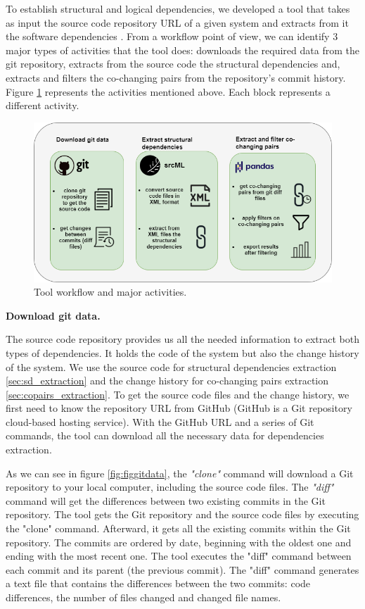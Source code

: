 \documentclass[12pt]{mitthesis}
\begin{document}
To establish structural and logical dependencies, we developed a tool that takes as input the source code repository URL of a given system and extracts from it the software dependencies \cite{DepSACI}. 
From a workflow point of view, we can identify 3 major types of activities that the tool does: downloads the required data from the git repository, extracts from the source code the structural dependencies and, extracts and filters the co-changing pairs from the repository's commit history. Figure \ref{fig:figworkflow} represents the activities mentioned above. Each block represents a different activity. 

\begin{figure}[H]
\centering
\includegraphics[width=\textwidth]{tool_workflow.png}
\caption{Tool workflow and major activities.}
\label{fig:figworkflow}
\end{figure}


\textbf{Download git data.}

The source code repository provides us all the needed information to extract both types of dependencies. It holds the code of the system but also the change history of the system. We use the source code for structural dependencies extraction \ref{sec:sd_extraction} and the change history for co-changing pairs extraction \ref{sec:copairs_extraction}.
To get the source code files and the change history, we first need to know the repository URL from GitHub (GitHub is a Git repository cloud-based hosting service). With the GitHub URL and a series of Git commands, the tool can download all the necessary data for dependencies extraction.

As we can see in figure \ref{fig:figgitdata}, the \textit{"clone"} command will download a Git repository to your local computer, including the source code files. The \textit{"diff"} command will get the differences between two existing commits in the Git repository. 
The tool gets the Git repository and the source code files by executing the "clone" command. Afterward, it gets all the existing commits within the Git repository. The commits are ordered by date, beginning with the oldest one and ending with the most recent one. The tool executes the "diff" command between each commit and its parent (the previous commit). The "diff" command generates a text file that contains the differences between the two commits: code differences, the number of files changed and changed file names.
\end{document}
